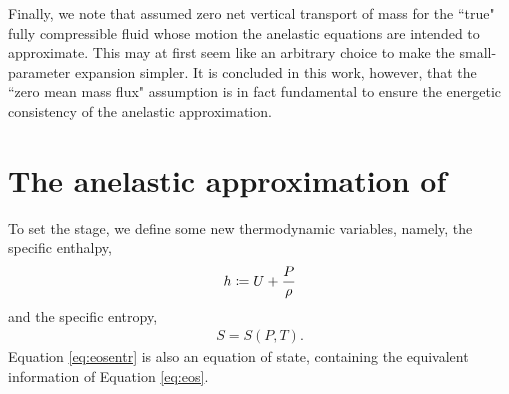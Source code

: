 \documentclass[12pt]{article}
\begin{document}
Finally, we note that \citet{Gough1969} assumed zero net vertical transport of mass for the ``true" fully compressible fluid whose motion the anelastic equations are intended to approximate. This may at first seem like an arbitrary choice to make the small-parameter expansion simpler. It is concluded in this work, however, that the ``zero mean mass flux" assumption is in fact fundamental to ensure the energetic consistency of the anelastic approximation. 

	\section{The anelastic approximation of \citet{Gough1969}}\label{sec:goughorig}
	To set the stage, we define some new thermodynamic variables, namely, the specific enthalpy,
\begin{align}\label{eq:enthalpy}
	h\coloneqq U + \frac{P}{\rho}
\end{align}
and the specific entropy,
\begin{align}\label{eq:eosentr}
	S = S(P,T).
\end{align}
Equation \eqref{eq:eosentr} is also an equation of state, containing the equivalent information of Equation \eqref{eq:eos}. 
\end{document}
